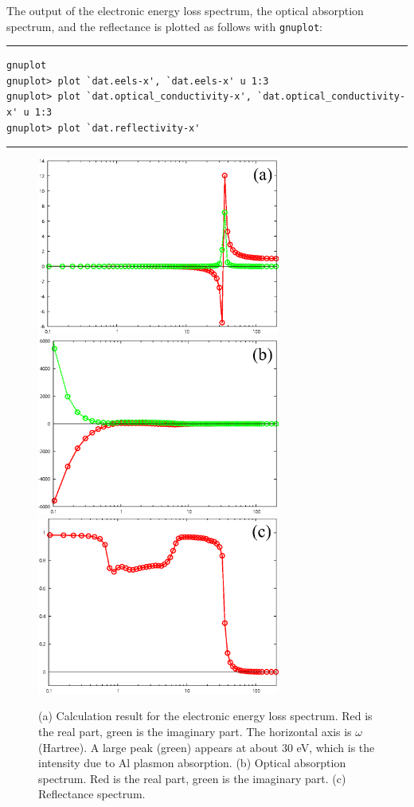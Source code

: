 \documentclass{article}
\begin{document}
The output of the electronic energy loss spectrum, the optical absorption spectrum, and the reflectance is plotted as follows with {\tt gnuplot}: 
\vspace{3mm}\hrule
\begin{verbatim} 
gnuplot 
gnuplot> plot `dat.eels-x', `dat.eels-x' u 1:3 
gnuplot> plot `dat.optical_conductivity-x', `dat.optical_conductivity-x' u 1:3 
gnuplot> plot `dat.reflectivity-x' 
\end{verbatim}
\hrule\vspace{3mm}
\begin{figure}[H] 
\centering
\includegraphics[width=8cm]{eels-Al.eps}
\includegraphics[width=8cm]{optical_conductivity-Al.eps}
\includegraphics[width=8cm]{reflectivity-Al.eps}
\caption{(a) Calculation result for the electronic energy loss spectrum. Red is the real part, green is the imaginary part. The horizontal axis is $\omega$ (Hartree). A large peak (green) appears at about 30 eV, which is the intensity due to Al plasmon absorption. (b) Optical absorption spectrum. Red is the real part, green is the imaginary part. (c) Reflectance spectrum.} 
\label{eels}
\end{figure}
\end{document}
